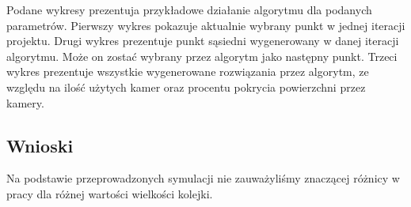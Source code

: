 \documentclass[12pt,a4paper]{article}
\begin{document}
\begin{landscape}
\pagestyle{empty}
\begin{figure}
\begin{floatrow}
       }
       \ffigbox[\FBwidth]{\caption{MediumMap, $d_p=1$, $d_k=0.1$, $skala=5$}\label{fig-4}}{%
         \texttt{[image: \{mediumMap\_1\_0.1\_5]}.png}
       }
       \end{floatrow}
\end{figure}
\end{landscape}

Podane wykresy prezentuja przykładowe działanie algorytmu dla podanych parametrów.
Pierwszy wykres pokazuje aktualnie wybrany punkt w jednej iteracji projektu.
Drugi wykres prezentuje punkt sąsiedni wygenerowany w danej iteracji algorytmu.
Może on zostać wybrany przez algorytm jako następny punkt.
Trzeci wykres prezentuje wszystkie wygenerowane rozwiązania przez algorytm, ze względu
na ilość użytych kamer oraz procentu pokrycia powierzchni przez kamery.

\subsection{Wnioski}
Na podstawie przeprowadzonych symulacji nie zauważyliśmy znaczącej różnicy w pracy dla różnej wartości wielkości kolejki.
\begin{figure}[h]
\begin{floatrow}
       \end{floatrow}
\end{figure}
\end{document}
